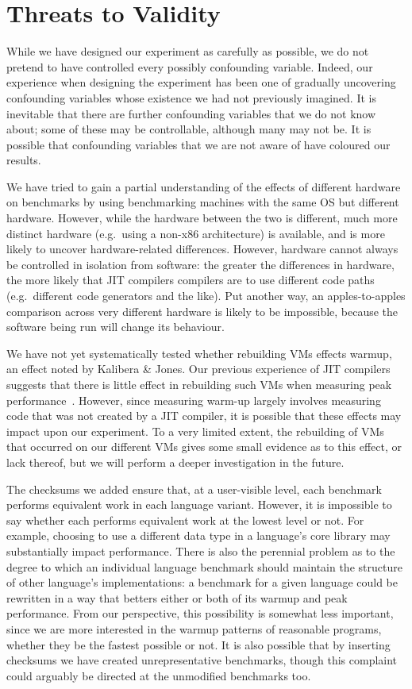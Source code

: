 \documentclass[preprint,numbers,10pt]{sigplanconf}
\newcommand{\kalibera}{Kalibera \& Jones\xspace}
\begin{document}
\section{Threats to Validity}
\label{sec:threats}

While we have designed our experiment as carefully as possible, we do not
pretend to have controlled every possibly confounding variable. Indeed, our
experience when designing the experiment has been one of gradually uncovering
confounding variables whose existence we had not previously imagined. It
is inevitable that there are further confounding variables that we
do not know about; some of these may be controllable, although many may not be.
It is possible that confounding variables that we are not aware of have
coloured our results.

We have tried to gain a partial understanding of the effects of different
hardware on benchmarks by using benchmarking machines with the same OS but
different hardware. However, while the hardware between the two is
different, much more distinct hardware (e.g.~using a non-x86 architecture) is
available, and is more likely to uncover hardware-related differences.
However, hardware cannot always be controlled in isolation from software:
the greater the differences in hardware, the more likely that JIT compilers
compilers are to use different code paths (e.g.~different code generators and
the like). Put another way, an apples-to-apples comparison across very different
hardware is likely to be impossible, because the software being run will
change its behaviour.

We have not yet systematically tested whether rebuilding VMs effects warmup, an
effect noted by \kalibera. Our previous experience of JIT compilers suggests
that there is little effect in rebuilding such VMs when measuring peak
performance~\cite{barrett15approaches}. However, since measuring warm-up largely
involves measuring code that was not created by a JIT compiler, it is possible
that these effects may impact upon our experiment. To a very limited extent, the
rebuilding of VMs that occurred on our different VMs gives some small evidence
as to this effect, or lack thereof, but we will perform a deeper investigation
in the future.

The checksums we added ensure that, at a user-visible level, each benchmark
performs equivalent work in each language variant. However, it is impossible to
say whether each performs equivalent work at the lowest level or not. For
example, choosing to use a different data type in a language's core library may
substantially impact performance. There is also the perennial problem as to the
degree to which an individual language benchmark should maintain the structure
of other language's implementations: a benchmark for a given language could be
rewritten in a way that betters either or both of its warmup and peak
performance. From our perspective, this possibility is somewhat less important,
since we are more interested in the warmup patterns of reasonable programs,
whether they be the fastest possible or not. It is also possible that by
inserting checksums we have created unrepresentative benchmarks, though
this complaint could arguably be directed at the unmodified benchmarks too.
\end{document}
